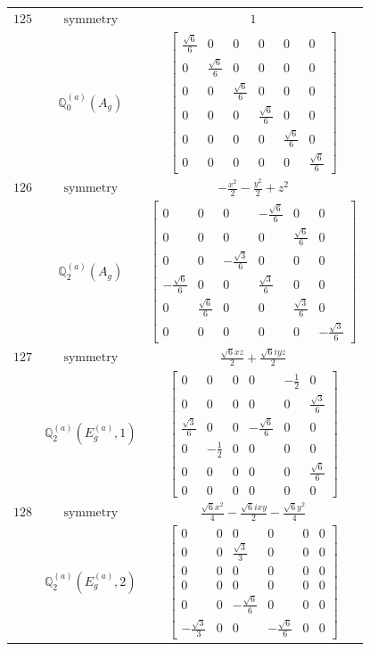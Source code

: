 \documentclass[fleqn,8pt,landscape]{jsarticle}
\begin{document}
\begin{longtable}{ccc}
$ 125 $ & $ \text{symmetry} $ & $ 1 $ \\
$  $ & $ \mathbb{Q}_{0}^{(a)}(A_{g}) $ & $ \begin{bmatrix} \frac{\sqrt{6}}{6} & 0 & 0 & 0 & 0 & 0 \\ 0 & \frac{\sqrt{6}}{6} & 0 & 0 & 0 & 0 \\ 0 & 0 & \frac{\sqrt{6}}{6} & 0 & 0 & 0 \\ 0 & 0 & 0 & \frac{\sqrt{6}}{6} & 0 & 0 \\ 0 & 0 & 0 & 0 & \frac{\sqrt{6}}{6} & 0 \\ 0 & 0 & 0 & 0 & 0 & \frac{\sqrt{6}}{6} \end{bmatrix} $ \\ \hline
$ 126 $ & $ \text{symmetry} $ & $ - \frac{x^{2}}{2} - \frac{y^{2}}{2} + z^{2} $ \\
$  $ & $ \mathbb{Q}_{2}^{(a)}(A_{g}) $ & $ \begin{bmatrix} 0 & 0 & 0 & - \frac{\sqrt{6}}{6} & 0 & 0 \\ 0 & 0 & 0 & 0 & \frac{\sqrt{6}}{6} & 0 \\ 0 & 0 & - \frac{\sqrt{3}}{6} & 0 & 0 & 0 \\ - \frac{\sqrt{6}}{6} & 0 & 0 & \frac{\sqrt{3}}{6} & 0 & 0 \\ 0 & \frac{\sqrt{6}}{6} & 0 & 0 & \frac{\sqrt{3}}{6} & 0 \\ 0 & 0 & 0 & 0 & 0 & - \frac{\sqrt{3}}{6} \end{bmatrix} $ \\ \hline
$ 127 $ & $ \text{symmetry} $ & $ \frac{\sqrt{6} x z}{2} + \frac{\sqrt{6} i y z}{2} $ \\
$  $ & $ \mathbb{Q}_{2}^{(a)}(E_{g}^{(a)},1) $ & $ \begin{bmatrix} 0 & 0 & 0 & 0 & - \frac{1}{2} & 0 \\ 0 & 0 & 0 & 0 & 0 & \frac{\sqrt{3}}{6} \\ \frac{\sqrt{3}}{6} & 0 & 0 & - \frac{\sqrt{6}}{6} & 0 & 0 \\ 0 & - \frac{1}{2} & 0 & 0 & 0 & 0 \\ 0 & 0 & 0 & 0 & 0 & \frac{\sqrt{6}}{6} \\ 0 & 0 & 0 & 0 & 0 & 0 \end{bmatrix} $ \\ \hline
$ 128 $ & $ \text{symmetry} $ & $ \frac{\sqrt{6} x^{2}}{4} - \frac{\sqrt{6} i x y}{2} - \frac{\sqrt{6} y^{2}}{4} $ \\
$  $ & $ \mathbb{Q}_{2}^{(a)}(E_{g}^{(a)},2) $ & $ \begin{bmatrix} 0 & 0 & 0 & 0 & 0 & 0 \\ 0 & 0 & \frac{\sqrt{3}}{3} & 0 & 0 & 0 \\ 0 & 0 & 0 & 0 & 0 & 0 \\ 0 & 0 & 0 & 0 & 0 & 0 \\ 0 & 0 & - \frac{\sqrt{6}}{6} & 0 & 0 & 0 \\ - \frac{\sqrt{3}}{3} & 0 & 0 & - \frac{\sqrt{6}}{6} & 0 & 0 \end{bmatrix} $ \\ \hline

\end{longtable}
\end{document}
